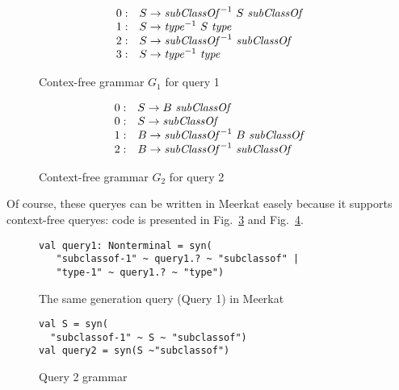 \begin{figure}[h]
   \centering
   \[
\begin{array}{rl}
   0: & S \rightarrow \text{\textit{subClassOf}}^{-1} \ S \ \text{\textit{subClassOf}} \\ 
   1: & S \rightarrow \text{\textit{type}}^{-1} \ S \ \text{\textit{type}} \\ 
   2: & S \rightarrow \text{\textit{subClassOf}}^{-1} \ \text{\textit{subClassOf}} \\ 
   3: & S \rightarrow \text{\textit{type}}^{-1} \ \text{\textit{type}} \\ 
\end{array}
\]
   \caption{Contex-free grammar $G_1$ for query 1}
   \label{grammarQ1}
   \end{figure}

\begin{figure}[h]
   \centering
   \[
\begin{array}{rl}
   0: & S \rightarrow B \ \text{\textit{subClassOf}} \\ 
   0: & S \rightarrow \text{\textit{subClassOf}} \\ 
   1: & B \rightarrow \text{\textit{subClassOf}}^{-1} \ B \ \text{\textit{subClassOf}} \\
   2: & B \rightarrow \text{\textit{subClassOf}}^{-1} \ \text{\textit{subClassOf}} \\ 
\end{array}
\]
   \caption{Context-free grammar $G_2$ for query 2}
   \label{grammarQ2}        
   \end{figure}

   Of course, these queryes can be written in Meerkat easely because it supports context-free queryes: code is presented in Fig.~\ref{fig:query1Meerkat} and Fig.~\ref{fig:query2Meerkat}.

\begin{figure}[h]
\begin{lstlisting}
val query1: Nonterminal = syn(
   "subclassof-1" ~ query1.? ~ "subclassof" |
   "type-1" ~ query1.? ~ "type")
\end{lstlisting}
\caption{The same generation query (Query 1) in Meerkat}
\label{fig:query1Meerkat}
\end{figure}


\begin{figure}[h]
\begin{lstlisting}
val S = syn(
  "subclassof-1" ~ S ~ "subclassof")
val query2 = syn(S ~"subclassof")
\end{lstlisting}
\caption{Query 2 grammar}
\label{fig:query2Meerkat}
\end{figure}

